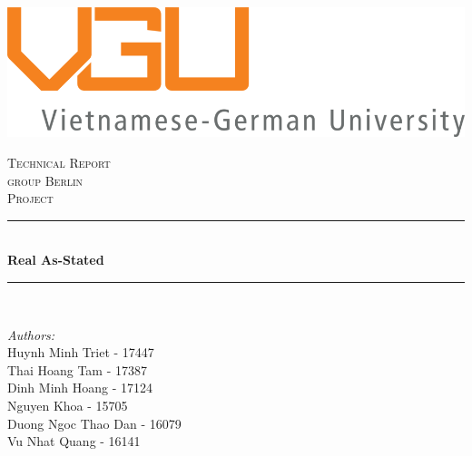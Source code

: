 \begin{titlepage}

\newcommand{\HRule}{\rule{\linewidth}{0.5mm}} %

\centering
\includegraphics{./title/Logo20.png}


 

\center %


\textsc{\LARGE Technical Report}\\[1.5cm] 
\textsc{\Large group Berlin}\\[0.5cm] 
\textsc{\large Project}\\[0.5cm] 

\makeatletter
\HRule \\[0.4cm]
{ \huge \bfseries Real As-Stated }\\[0.4cm] %
\HRule \\[1.5cm]
 

\begin{minipage}{0.5\textwidth}
\begin{flushleft} \large
\emph{Authors:}\\
Huynh Minh Triet - 17447\\
Thai Hoang Tam   -  17387\\
Dinh Minh Hoang  - 17124\\
Nguyen Khoa - 15705\\
Duong Ngoc Thao Dan -  16079\\
Vu Nhat Quang - 16141 



\end{flushleft}
\end{minipage}
\end{titlepage}
